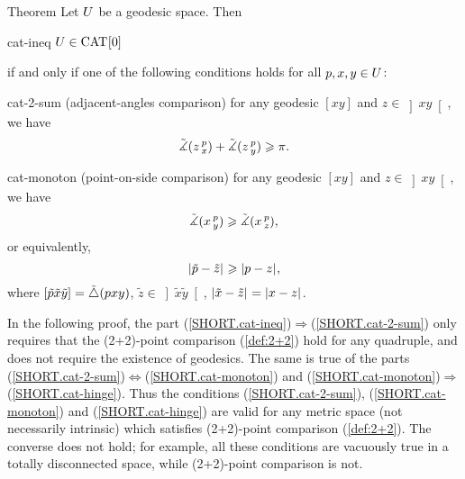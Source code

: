 \begin{thm}{Theorem}
\label{thm:defs_of_cat} 
Let  $\spc{U}$ be a geodesic space.  Then
\begin{subthm}{cat-ineq} 
$\spc{U}\in\Cat{}{0}$
\end{subthm}
if and only if 
one of the following conditions holds for all $p,x,y\in \spc{U}$:

\begin{subthm}{cat-2-sum} (adjacent-angles comparison) for any geodesic $[x y]$ and $z\in \left]x y\right[$, we have
\[\angk0 z p x
+\angk0 z p y\ge \pi.\]
\end{subthm}

\begin{subthm}{cat-monoton}
(point-on-side comparison) 
for any geodesic $[x y]$ and $z\in \left]x y\right[$, we have
\[\angk0 x p y\ge\angk0 x p z,\]
or equivalently, 
\[\dist{\tilde p}{\tilde z}{}\ge \dist{p}{z}{},\]
where $\trig{\tilde p}{\tilde x}{\tilde y}=\modtrig0(p x y)$, 
$\tilde z\in\left] \tilde x\tilde y\right[$, $\dist{\tilde x}{\tilde z}{}=\dist{x}{z}{}$.
\end{subthm}

\end{thm}


\label{22remark}
In the following proof, the part (\ref{SHORT.cat-ineq})$\Rightarrow$(\ref{SHORT.cat-2-sum})
only requires that the (2+2)-point comparison (\ref{def:2+2}) hold for any quadruple, and does not require the existence of geodesics. 
The same is true of the parts (\ref{SHORT.cat-2-sum})$\Leftrightarrow$(\ref{SHORT.cat-monoton}) and
(\ref{SHORT.cat-monoton})$\Rightarrow$(\ref{SHORT.cat-hinge}).  Thus the conditions (\ref{SHORT.cat-2-sum}), (\ref{SHORT.cat-monoton}) and (\ref{SHORT.cat-hinge}) are valid for any metric space (not necessarily intrinsic) which satisfies (2+2)-point comparison (\ref{def:2+2}). 
The converse does not hold; for example, all these conditions are 
vacuously true in a 
totally disconnected space, while 
(2+2)-point comparison is not.

